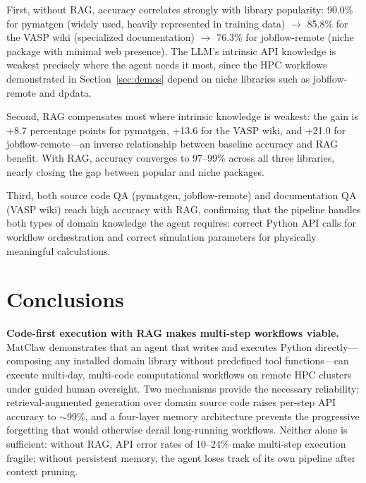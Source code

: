 \documentclass{article}
\begin{document}
First, without RAG, accuracy correlates strongly with library popularity: 90.0\% for pymatgen (widely used, heavily represented in training data) $\rightarrow$ 85.8\% for the VASP wiki (specialized documentation) $\rightarrow$ 76.3\% for jobflow-remote (niche package with minimal web presence).
The LLM's intrinsic API knowledge is weakest precisely where the agent needs it most, since the HPC workflows demonstrated in Section~\ref{sec:demos} depend on niche libraries such as jobflow-remote and dpdata.

Second, RAG compensates most where intrinsic knowledge is weakest: the gain is +8.7 percentage points for pymatgen, +13.6 for the VASP wiki, and +21.0 for jobflow-remote---an inverse relationship between baseline accuracy and RAG benefit.
With RAG, accuracy converges to 97--99\% across all three libraries, nearly closing the gap between popular and niche packages.

Third, both source code QA (pymatgen, jobflow-remote) and documentation QA (VASP wiki) reach high accuracy with RAG, confirming that the pipeline handles both types of domain knowledge the agent requires: correct Python API calls for workflow orchestration and correct simulation parameters for physically meaningful calculations.


\section{Conclusions}
\label{sec:conclusion}

\textbf{Code-first execution with RAG makes multi-step workflows viable.}
MatClaw demonstrates that an agent that writes and executes Python directly---composing any installed domain library without predefined tool functions---can execute multi-day, multi-code computational workflows on remote HPC clusters under guided human oversight.
Two mechanisms provide the necessary reliability: retrieval-augmented generation over domain source code raises per-step API accuracy to ${\sim}$99\%, and a four-layer memory architecture prevents the progressive forgetting that would otherwise derail long-running workflows.
Neither alone is sufficient: without RAG, API error rates of 10--24\% make multi-step execution fragile; without persistent memory, the agent loses track of its own pipeline after context pruning.
\end{document}
